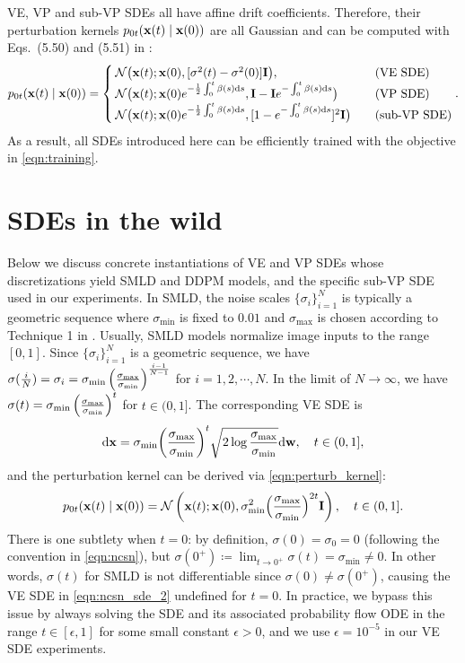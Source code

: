 VE, VP and sub-VP SDEs all have affine drift coefficients. Therefore, their perturbation kernels $p_{0t}(\mathbf{x}(t) \mid \mathbf{x}(0))$ are all Gaussian and can be computed with Eqs.~(5.50) and (5.51) in \citet{sarkka2019applied}:
\begin{align}
    p_{0t}(\mathbf{x}(t) \mid \mathbf{x}(0)) = \begin{cases} 
    \mathcal{N}\big(\mathbf{x}(t) ; \mathbf{x}(0), [\sigma^2(t) - \sigma^2(0)] \mathbf{I}\big), &~~~ \text{(VE SDE)}\\
    \mathcal{N}\big(\mathbf{x}(t) ; \mathbf{x}(0)e^{-\frac{1}{2}\int_0^t \beta(s) \mathrm{d} s}, \mathbf{I} - \mathbf{I} e^{-\int_0^t \beta(s) \mathrm{d} s}\big) &~~~ \text{(VP SDE)}\\
    \mathcal{N}\big(\mathbf{x}(t) ; \mathbf{x}(0)e^{-\frac{1}{2}\int_0^t \beta(s) \mathrm{d} s}, [1 - e^{-\int_0^t \beta(s) \mathrm{d} s}]^2 \mathbf{I}\big) &~~~ \text{(sub-VP SDE)}
    \end{cases}.\label{eqn:perturb_kernel}
\end{align}
As a result, all SDEs introduced here can be efficiently trained with the objective in \cref{eqn:training}.

\section{SDEs in the wild} \label{app:wild_sde}
Below we discuss concrete instantiations of VE and VP SDEs whose discretizations yield SMLD and DDPM models, and the specific sub-VP SDE used in our experiments. In SMLD, the noise scales $\{\sigma_i\}_{i=1}^N$ is typically a geometric sequence where $\sigma_\text{min}$ is fixed to $0.01$ and $\sigma_\text{max}$ is chosen according to Technique 1 in \citet{song2020improved}. Usually, SMLD models normalize image inputs to the range $[0, 1]$. Since $\{\sigma_i\}_{i=1}^N$ is a geometric sequence, we have $\sigma(\frac{i}{N}) = \sigma_i = \sigma_{\text{min}} \left(\frac{\sigma_{\text{max}}}{\sigma_{\text{min}}}\right)^{\frac{i-1}{N-1}}$ for $i=1,2,\cdots, N$. In the limit of $N \to \infty$, we have $\sigma(t) = \sigma_{\text{min}} \left(\frac{\sigma_{\text{max}}}{\sigma_{\text{min}}}\right)^{t}$ for $t \in (0, 1]$. The corresponding VE SDE is
\begin{align}
\mathrm{d} \mathbf{x} = \sigma_{\text{min}} \bigg( \frac{\sigma_{\text{max}}}{\sigma_{\text{min}}} \bigg)^t \sqrt{2 \log \frac{\sigma_{\text{max}}}{\sigma_{\text{min}}}}\mathrm{d} \mathbf{w}, \quad t \in (0, 1],
\end{align}
and the perturbation kernel can be derived via \cref{eqn:perturb_kernel}:
\begin{align}
    p_{0t}(\mathbf{x}(t) \mid \mathbf{x}(0)) = \mathcal{N}\left(\mathbf{x}(t) ; \mathbf{x}(0), \sigma_{\text{min}}^2 \Big( \frac{\sigma_{\text{max}}}{\sigma_{\text{min}}}\Big)^{2t} \mathbf{I}\right), \quad t \in (0, 1].
\end{align}
There is one subtlety when $t=0$: by definition, $\sigma(0) = \sigma_0 = 0$ (following the convention in \cref{eqn:ncsn}), but $\sigma(0^+) \coloneqq \lim_{t \to 0^+} \sigma(t) = \sigma_\text{min} \neq 0$. In other words, $\sigma(t)$ for SMLD is not differentiable since $\sigma(0) \neq \sigma(0^+)$, causing the VE SDE in \cref{eqn:ncsn_sde_2} undefined for $t=0$. In practice, we bypass this issue by always solving the SDE and its associated probability flow ODE in the range $t \in [\epsilon, 1]$ for some small constant $\epsilon > 0$, and we use $\epsilon = 10^{-5}$ in our VE SDE experiments. %

